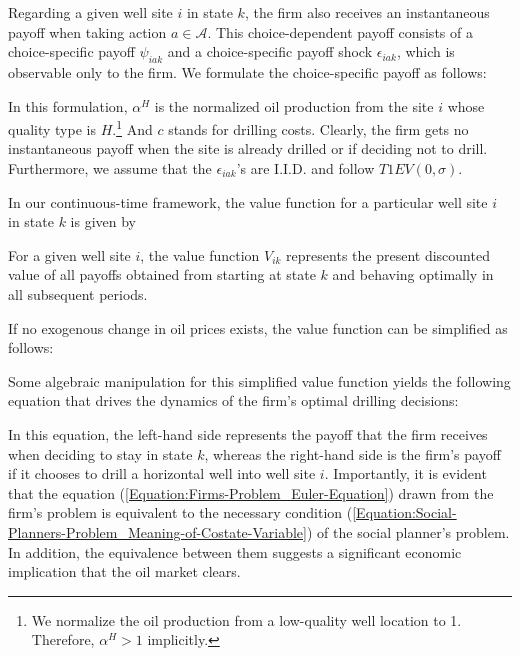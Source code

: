 Regarding a given well site $i$ in state $k$, the firm also receives an instantaneous payoff when taking action $a \in \mathcal{A}$. This choice-dependent payoff consists of a choice-specific payoff $\psi_{iak}$ and a choice-specific payoff shock $\epsilon_{iak}$, which is observable only to the firm. We formulate the choice-specific payoff as follows:

In this formulation, $\alpha^{H}$ is the normalized oil production from the site $i$ whose quality type is $H$.\footnote{We normalize the oil production from a low-quality well location to 1. Therefore, $\alpha^{H} > 1$ implicitly.} And $c$ stands for drilling costs. Clearly, the firm gets no instantaneous payoff when the site is already drilled or if deciding not to drill. 
Furthermore, we assume that the $\epsilon_{iak}$'s are I.I.D. and follow $T1EV(0, \sigma)$. 

In our continuous-time framework, the value function for a particular well site $i$ in state $k$ is given by

For a given well site $i$, the value function $V_{ik}$ represents the present discounted value of all payoffs obtained from starting at state $k$ and behaving optimally in all subsequent periods. 

If no exogenous change in oil prices exists, the value function can be simplified as follows:

Some algebraic manipulation for this simplified value function yields the following equation that drives the dynamics of the firm's optimal drilling decisions:

In this equation, the left-hand side represents the payoff that the firm receives when deciding to stay in state $k$, whereas the right-hand side is the firm's payoff if it chooses to drill a horizontal well into well site $i$. Importantly, it is evident that the equation (\ref{Equation:Firms-Problem_Euler-Equation}) drawn from the firm's problem is equivalent to the necessary condition (\ref{Equation:Social-Planners-Problem_Meaning-of-Costate-Variable}) of the social planner's problem. In addition, the equivalence between them suggests a significant economic implication that the oil market clears. 
